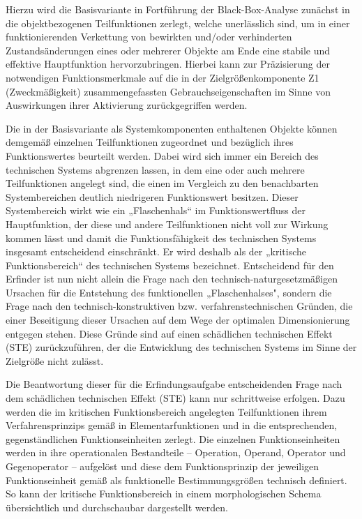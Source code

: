 \documentclass[12pt,a4paper]{article}
\begin{document}
Hierzu wird die Basisvariante in Fortführung der Black-Box-Analyse zunächst in
die objektbezogenen Teilfunktionen zerlegt, welche unerlässlich sind, um in
einer funktionierenden Verkettung von bewirkten und/oder verhinderten
Zustandsänderungen eines oder mehrerer Objekte am Ende eine stabile und
effektive Hauptfunktion hervorzubringen. Hierbei kann zur Präzisierung der
notwendigen Funktionsmerkmale auf die in der Zielgrößenkomponente Z1
(Zweckmäßigkeit) zusammengefassten Gebrauchseigenschaften im Sinne von
Auswirkungen ihrer Aktivierung zurückgegriffen werden.

Die in der Basisvariante als Systemkomponenten enthaltenen Objekte können
demgemäß einzelnen Teilfunktionen zugeordnet und bezüglich ihres
Funktionswertes beurteilt werden. Dabei wird sich immer ein Bereich des
technischen Systems abgrenzen lassen, in dem eine oder auch mehrere
Teilfunktionen angelegt sind, die einen im Vergleich zu den benachbarten
Systembereichen deutlich niedrigeren Funktionswert besitzen. Dieser
Systembereich wirkt wie ein „Flaschenhals“ im Funktionswertfluss der
Hauptfunktion, der diese und andere Teilfunktionen nicht voll zur Wirkung
kommen lässt und damit die Funktionsfähigkeit des technischen Systems
insgesamt entscheidend einschränkt. Er wird deshalb als der „kritische
Funktionsbereich“ des technischen Systems bezeichnet. Entscheidend für den
Erfinder ist nun nicht allein die Frage nach den technisch-naturgesetzmäßigen
Ursachen für die Entstehung des funktionellen „Flaschenhalses", sondern die
Frage nach den technisch-konstruktiven bzw. verfahrenstechnischen Gründen, die
einer Beseitigung dieser Ursachen auf dem Wege der optimalen Dimensionierung
entgegen stehen. Diese Gründe sind auf einen schädlichen technischen Effekt
(STE) zurückzuführen, der die Entwicklung des technischen Systems im Sinne der
Zielgröße nicht zulässt.

Die Beantwortung dieser für die Erfindungsaufgabe entscheidenden Frage nach
dem schädlichen technischen Effekt (STE) kann nur schrittweise erfolgen. Dazu
werden die im kritischen Funktionsbereich angelegten Teilfunktionen ihrem
Verfahrensprinzips gemäß in Elementarfunktionen und in die entsprechenden,
gegenständlichen Funktionseinheiten zerlegt. Die einzelnen Funktionseinheiten
werden in ihre operationalen Bestandteile -- Operation, Operand, Operator und
Gegenoperator -- aufgelöst und diese dem Funktionsprinzip der jeweiligen
Funktionseinheit gemäß als funktionelle Bestimmungsgrößen technisch
definiert. So kann der kritische Funktionsbereich in einem morphologischen
Schema übersichtlich und durchschaubar dargestellt werden.
\end{document}
